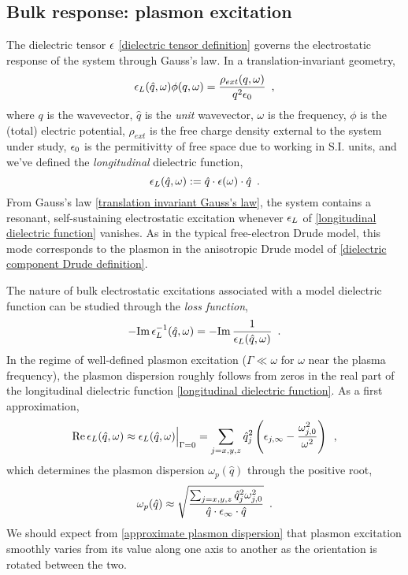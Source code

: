 \subsection{Bulk response: plasmon excitation}

The dielectric tensor $\epsilon$ \eqref{dielectric tensor definition} governs the electrostatic response of the system through Gauss's law.  In a translation-invariant geometry,
\begin{equation}
    \label{translation invariant Gauss's law}
    \epsilon_L(\hat q,\omega) \phi(q,\omega) = \frac{\rho_{ext}(q,\omega)}{q^2 \epsilon_0}\,\,\,,
\end{equation}
where $q$ is the wavevector, $\hat q$ is the {\it unit} wavevector, $\omega$ is the frequency, $\phi$ is the (total) electric potential, $\rho_{ext}$ is the free charge density external to the system under study, $\epsilon_0$ is the permitivitty of free space due to working in S.I. units, and we've defined the {\it longitudinal} dielectric function,
\begin{equation}
    \label{longitudinal dielectric function}
    \epsilon_L(\hat q,\omega) := \hat q\cdot \epsilon(\omega)\cdot \hat q\,\,\,.
\end{equation}
From Gauss's law \eqref{translation invariant Gauss's law}, the system contains a resonant, self-sustaining electrostatic excitation whenever $\epsilon_L$ of \eqref{longitudinal dielectric function} vanishes.  As in the typical free-electron Drude model, this mode corresponds to the plasmon in the anisotropic Drude model of \eqref{dielectric component Drude definition}.

The nature of bulk electrostatic excitations associated with a model dielectric function can be studied through the {\it loss function},
\begin{equation}
    \label{bulk loss function}
    -\text{Im}\, \epsilon^{-1}_L(\hat q,\omega) = -\text{Im}\,\frac{1}{\epsilon_L(\hat q,\omega)}
    \,\,\,.
\end{equation}
In the regime of well-defined plasmon excitation ($\Gamma \ll \omega$ for $\omega$ near the plasma frequency), the plasmon dispersion roughly follows from zeros in the real part of the longitudinal dielectric function \eqref{longitudinal dielectric function}.  As a first approximation,
\begin{equation}
    \label{real part of longitudinal dielectric function without damping}
    \text{Re}\,\epsilon_L(\hat q, \omega) \approx \epsilon_L(\hat q, \omega)\Big|_{\Gamma = 0}
    =
    \sum_{j=x,y,z} \hat q_j^2\left(\epsilon_{j,\infty} - \frac{\omega_{j,0}^2}{\omega^2}\right)
    \,\,\,,
\end{equation}
which determines the plasmon dispersion $\omega_p(\hat q)$ through the positive root,
\begin{equation}
    \label{approximate plasmon dispersion}
    \omega_p(\hat q) \approx 
    \sqrt{\frac{\sum_{j=x,y,z} \hat q_j^2 \omega_{j,0}^2}{\hat q \cdot \epsilon_{\infty} \cdot \hat q}}
    \,\,\,.
\end{equation}
We should expect from \eqref{approximate plasmon dispersion} that plasmon excitation smoothly varies from its value along one axis to another as the orientation is rotated between the two.

